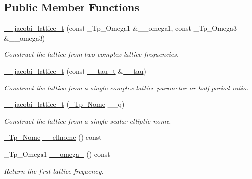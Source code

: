 \subsection*{Public Member Functions}
\begin{DoxyCompactItemize}
\item 
\hyperlink{structstd_1_1____detail_1_1____jacobi__lattice__t_a60eb3027f7b2e1a59154f36a720bb366}{\+\_\+\+\_\+jacobi\+\_\+lattice\+\_\+t} (const \+\_\+\+Tp\+\_\+\+Omega1 \&\+\_\+\+\_\+omega1, const \+\_\+\+Tp\+\_\+\+Omega3 \&\+\_\+\+\_\+omega3)
\begin{DoxyCompactList}\small\item\em Construct the lattice from two complex lattice frequencies. \end{DoxyCompactList}\item 
\hyperlink{structstd_1_1____detail_1_1____jacobi__lattice__t_a057b7fa65a9046eee377801fc518ed80}{\+\_\+\+\_\+jacobi\+\_\+lattice\+\_\+t} (const \hyperlink{structstd_1_1____detail_1_1____jacobi__lattice__t_1_1____tau__t}{\+\_\+\+\_\+tau\+\_\+t} \&\hyperlink{structstd_1_1____detail_1_1____jacobi__lattice__t_a53604ddbd063b9d71760a0edd7b57e2b}{\+\_\+\+\_\+tau})
\begin{DoxyCompactList}\small\item\em Construct the lattice from a single complex lattice parameter or half period ratio. \end{DoxyCompactList}\item 
\hyperlink{structstd_1_1____detail_1_1____jacobi__lattice__t_a0ee07a6d4ef66a0b1561f1041183b836}{\+\_\+\+\_\+jacobi\+\_\+lattice\+\_\+t} (\hyperlink{structstd_1_1____detail_1_1____jacobi__lattice__t_a0de534a75abb780f607e9d3cd8b84e42}{\+\_\+\+Tp\+\_\+\+Nome} \+\_\+\+\_\+q)
\begin{DoxyCompactList}\small\item\em Construct the lattice from a single scalar elliptic nome. \end{DoxyCompactList}\item 
\hyperlink{structstd_1_1____detail_1_1____jacobi__lattice__t_a0de534a75abb780f607e9d3cd8b84e42}{\+\_\+\+Tp\+\_\+\+Nome} \hyperlink{structstd_1_1____detail_1_1____jacobi__lattice__t_a4afbd17e958a568f58649d4dacc2e0b4}{\+\_\+\+\_\+ellnome} () const
\item 
\+\_\+\+Tp\+\_\+\+Omega1 \hyperlink{structstd_1_1____detail_1_1____jacobi__lattice__t_afabed4a35ae12b4631138b3dc9ceec6a}{\+\_\+\+\_\+omega\+\_} () const
\begin{DoxyCompactList}\small\item\em Return the first lattice frequency. \end{DoxyCompactList}\item 

\end{DoxyCompactItemize}
